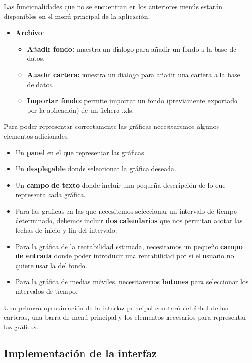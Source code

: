 \documentclass[12pt, a4paper]{book}
\begin{document}
Las funcionalidades que no se encuentran en los anteriores menús estarán disponibles en el menú principal de la aplicación.

\begin{itemize}
	\item \textbf{Archivo}:
	\begin{itemize}
		\item\textbf{Añadir fondo:} muestra un dialogo para añadir un fondo a la base de datos.
		\item \textbf{Añadir cartera:} muestra un dialogo para añadir una cartera a la base de datos.
		\item \textbf{Importar fondo:} permite importar un fondo (previamente exportado por la aplicación) de un fichero .xls.\\
	\end{itemize}
\end{itemize}

Para poder representar correctamente las gráficas necesitaremos algunos elementos adicionales: 
\begin{itemize}
	\item Un \textbf{panel} en el que representar las gráficas.
	\item Un \textbf{desplegable} donde seleccionar la gráfica deseada.
	\item Un \textbf{campo de texto} donde incluir una pequeña descripción de lo que representa cada gráfica.
	\item Para las gráficas en las que necesitemos seleccionar un intervalo de tiempo determinado, debemos incluir \textbf{dos calendarios} que nos permitan acotar las fechas de inicio y fin del intervalo.
	\item Para la gráfica de la rentabilidad estimada, necesitamos un pequeño \textbf{campo de entrada} donde poder introducir una rentabilidad por si el usuario no quiere usar la del fondo.
	\item Para la gráfica de medias móviles, necesitaremos \textbf{botones} para seleccionar los intervalos de tiempo.
\end{itemize}


Una primera aproximación de la interfaz principal constará del árbol de las carteras, una barra de menú principal y los elementos necesarios para representar las gráficas.

\newpage

\subsection{Implementación de la interfaz}
\end{document}
